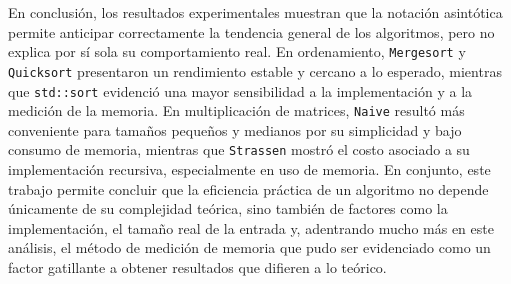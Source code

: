 En conclusión, los resultados experimentales muestran que la notación asintótica permite anticipar correctamente la tendencia general de los algoritmos, 
pero no explica por sí sola su comportamiento real. En ordenamiento, \texttt{Mergesort} y \texttt{Quicksort} presentaron un rendimiento estable y cercano a lo esperado, 
mientras que \texttt{std::sort} evidenció una mayor sensibilidad a la implementación y a la medición de la memoria. En multiplicación de matrices, \texttt{Naive} resultó 
más conveniente para tamaños pequeños y medianos por su simplicidad y bajo consumo de memoria, mientras que \texttt{Strassen} mostró el costo asociado a su implementación recursiva, 
especialmente en uso de memoria. En conjunto, este trabajo permite concluir que la eficiencia práctica de un algoritmo no depende únicamente de su complejidad teórica, sino 
también de factores como la implementación, el tamaño real de la entrada y, adentrando mucho más en este análisis, el método de medición de memoria que pudo ser evidenciado como un factor
gatillante a obtener resultados que difieren a lo teórico.
